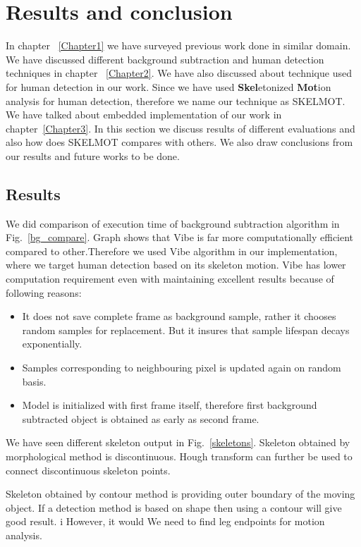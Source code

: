 \chapter{Results and conclusion} %
\label{Chapter4}
\indent In chapter ~\ref{Chapter1} we have surveyed previous work done
in similar domain. We have discussed different background subtraction
and human detection techniques in chapter ~\ref{Chapter2}. We have also
discussed about technique used for human detection in our work.  Since
we have used \textbf{Skel}etonized \textbf{Mot}ion analysis for human
detection, therefore we name our technique as SKELMOT. We have talked
about embedded implementation of our work in chapter~\ref{Chapter3}. In
this section we discuss results of different evaluations and also how
does SKELMOT compares with others. We also draw conclusions from our
results and future works to be done.
\section{Results}
\indent We did comparison of execution time of background subtraction
algorithm in Fig.~\ref{bg_compare}. Graph shows that Vibe is far more
computationally efficient compared to other.Therefore we used Vibe
algorithm in our implementation, where we target human detection based
on its skeleton motion. Vibe has lower computation requirement even with
maintaining excellent results because of following reasons:
\begin{itemize}
	\item It does not save complete frame as background sample,
		rather it chooses random samples for replacement. But it
		insures that sample lifespan decays exponentially.
	\item Samples corresponding to neighbouring pixel is updated
		again on random basis.
	\item Model is initialized with first frame itself, therefore first
		background subtracted object is obtained as early as
		second frame.
\end{itemize}
\indent We have seen different skeleton output in Fig.~\ref{skeletons}.
Skeleton obtained by morphological method is discontinuous. Hough
transform can further be used to connect discontinuous skeleton points.
 
Skeleton obtained by contour method is providing outer boundary of the
moving object. If a detection method is based on shape then using a
contour will give good result. i
However, it would We need to find leg endpoints for motion analysis.

